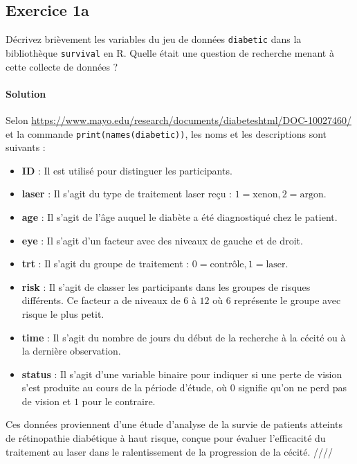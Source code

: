 \documentclass[../main.tex]{subfiles}
\begin{document}
\begin{CJK*}{UTF8}{gbsn}

\section*{Exercice 1a}
Décrivez brièvement les variables du jeu de données 
\texttt{diabetic} dans la bibliothèque \texttt{survival} en R.
Quelle était une question de recherche menant à cette collecte de données ?

\paragraph{Solution}

Selon \url{https://www.mayo.edu/research/documents/diabeteshtml/DOC-10027460/}
et la commande \texttt{print(names(diabetic))}, 
les noms et les descriptions sont suivants :

\begin{itemize}
  \item \textbf{ID} : Il est utilisé pour distinguer les participants.
  \item \textbf{laser} : Il s'agit du type de traitement laser reçu : $1=\text{xenon}, 2=\text{argon}$.
  \item \textbf{age} : Il s'agit de l'âge auquel le diabète a été diagnostiqué chez le patient.
  \item \textbf{eye} : Il s'agit d'un facteur avec des niveaux de gauche et de droit.
  \item \textbf{trt} : Il s'agit du groupe de traitement : $0=\text{contrôle}, 1=\text{laser}$.
  \item \textbf{risk} : Il s'agit de classer les participants dans les groupes de risques différents.
  Ce facteur a de niveaux de $6$ à $12$ où $6$ représente le groupe avec risque le plus petit.
  \item \textbf{time} : Il s'agit du nombre de jours du début de la recherche à la cécité 
  ou à la dernière observation.
  \item \textbf{status} : Il s'agit d'une variable binaire 
  pour indiquer si une perte de vision s'est produite au cours de la période d'étude, 
  où $0$ signifie qu'on ne perd pas de vision et $1$ pour le contraire.
\end{itemize}

Ces données proviennent d'une étude d'analyse de 
la survie de patients atteints de rétinopathie diabétique à haut risque, 
conçue pour évaluer l'efficacité du traitement au laser dans le ralentissement de la progression de la cécité. ////

\end{CJK*}
\end{document}
